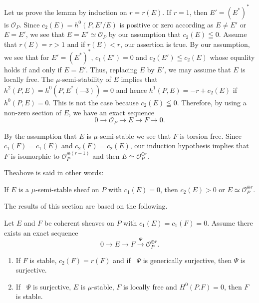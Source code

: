 \begin{Proof}
Let us prove the lemma by induction on $r=r(E)$. If $r=1$, then
$E'=(E^{\ast})^{\ast}$ is $\mathscr{O}_P$. Since
$c_2(E)=h^{0}\left(P,E'/E\right)$ is positive or zero
according as $E\neq E'$ or $E=E'$, we see that $E=E'\simeq
\mathscr{O}_P$ by our assumption that $c_2(E)\leqq 0$. Assume that
$r(E)=r>1$ and if $r(E)<r$, our assertion is true. By our assumption,
we see that for $E'=(E^{\ast})^{\ast}$, $c_1(E')=0$ and $c_2(E')\leqq
c_2(E)$ whose equality holds if and only if $E=E'$. Thus, replacing
$E$ by $E'$, we may assume that $E$ is locally free. The
$\mu$-semi-stability of $E$ implies that
$h^{2}(P,E)=h^{0}(P,E^{\ast}(-3))=0$ and hence $h^{1}(P,E)=-r+c_2(E)$
if $h^{0}(P,E)=0$. This is not the case because $c_2(E)\leqq
0$. Therefore, by using a non-zero section of $E$, we have an exact
sequence 
$$
0\rightarrow \mathscr{O}_P\rightarrow E\rightarrow F\rightarrow 0.
$$

By the assumption that $E$ is $\mu$-semi-stable we see that $F$ is
torsion free. Since $c_1(F)=c_1(E)$ and $c_2(F)=c_2(E)$, our induction
hypothesis implies that $F$ is isomorphic to
$\mathscr{O}^{\oplus(r-1)}_P$ and then $E\simeq \mathscr{O}^{\oplus
  r}_P$.
\enprf
\end{Proof}

The\pageoriginale above is said in other words:

\begin{cor}\label{cor1.3.1}
If $E$ is a $\mu$-semi-stable sheaf on $P$ with $c_1(E)=0$, then
$c_2(E)>0$ or $E\simeq \mathscr{O}^{\oplus r}_P$.
\end{cor}

The results of this section are based on the following.

\begin{lemma}\label{lemma1.4}
Let $E$ and $F$ be coherent sheaves on $P$ with
$c_1(E)=c_1(F)=0$. Assume there exists an exact sequence
$$
0\rightarrow E\rightarrow F\xrightarrow{\Psi}\mathscr{O}^{\oplus r}_P.
$$
\begin{enumerate}
\renewcommand{\labelenumi}{(\theenumi)}
\item If $F$ is stable, $c_2(F)=r(F)$ and if \ $\Psi$ is generically
  surjective, then $\Psi$ is surjective.

\item If \ $\Psi$ is surjective, $E$ is $\mu$-stable, $F$ is locally
  free and $H^0(P.F)=0$, then $F$ is stable.
\end{enumerate}
\end{lemma}

